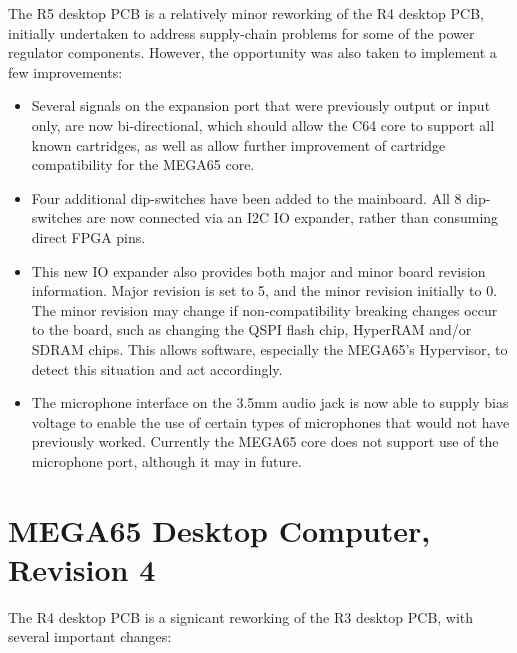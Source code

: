 The R5 desktop PCB is a relatively minor reworking of the R4 desktop PCB, initially undertaken to address supply-chain problems for some of the power regulator components. However, the opportunity was also taken to implement a few improvements:

\begin{itemize}
\item Several signals on the expansion port that were previously output or input only, are now bi-directional, which should allow the C64 core to support all known cartridges, as well as allow further improvement of cartridge compatibility for the MEGA65 core.
\item Four additional dip-switches have been added to the mainboard. All 8 dip-switches are now connected via an I2C IO expander, rather than consuming direct FPGA pins.
\item This new IO expander also provides both major and minor board revision information. Major revision is set to 5, and the minor revision initially to 0. The minor revision may change if non-compatibility breaking changes occur to the board, such as changing the QSPI flash chip, HyperRAM and/or SDRAM chips. This allows software, especially the MEGA65's Hypervisor, to detect this situation and act accordingly.
  \item The microphone interface on the 3.5mm audio jack is now able to supply bias voltage to enable the use of certain types of microphones that would not have previously worked.  Currently the MEGA65 core does not support use of the microphone port, although it may in future.

\end{itemize}

\section{MEGA65 Desktop Computer, Revision 4}

The R4 desktop PCB is a signicant reworking of the R3 desktop PCB, with several important changes:

